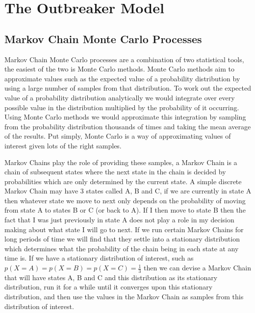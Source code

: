 \documentclass[11pt,a4paper]{report}
\begin{document}
\section{The Outbreaker Model}
\subsection{Markov Chain Monte Carlo Processes}
Markov Chain Monte Carlo processes are a combination of two statistical tools, the easiest of the two is Monte Carlo methods. Monte Carlo methods aim to approximate values such as the expected value of a probability distribution by using a large number of samples from that distribution. To work out the expected value of a probability distribution analytically we would integrate over every possible value in the distribution multiplied by the probability of it occurring. Using Monte Carlo methods we would approximate this integration by sampling from the probability distribution thousands of times and taking the mean average of the results. Put simply, Monte Carlo is a way of approximating values of interest given lots of the right samples.

Markov Chains play the role of providing these samples, a Markov Chain is a chain of subsequent states where the next state in the chain is decided by probabilities which are only determined by the current state. A simple discrete Markov Chain may have 3 states called A, B and C, if we are currently in state A then whatever state we move to next only depends on the probability of moving from state A to states B or C (or back to A). If I then move to state B then the fact that I was just previously in state A does not play a role in my decision making about what state I will go to next. If we run certain Markov Chains for long periods of time we will find that they settle into a stationary distribution which determines what the probability of the chain being in each state at any time is. If we have a stationary distribution of interest, such as $p(X=A)=p(X=B)=p(X=C)=\frac{1}{3}$ then we can devise a Markov Chain that will have states A, B and C and this distribution as its stationary distribution, run it for a while until it converges upon this stationary distribution, and then use the values in the Markov Chain as samples from this distribution of interest.
\end{document}
